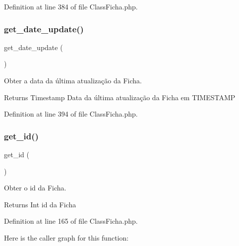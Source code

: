 Definition at line 384 of file Class\+Ficha.\+php.

\mbox{\label{class_class_ficha_ab88c852c9268bc8bf4f41240068dc81e}} 
\subsubsection{\texorpdfstring{get\+\_\+date\+\_\+update()}{get\_date\_update()}}
{\footnotesize\ttfamily get\+\_\+date\+\_\+update (\begin{DoxyParamCaption}{ }\end{DoxyParamCaption})}



Obter a data da última atualização da Ficha. 

\begin{DoxyReturn}{Returns}
Timestamp Data da última atualização da Ficha em T\+I\+M\+E\+S\+T\+A\+MP 
\end{DoxyReturn}


Definition at line 394 of file Class\+Ficha.\+php.

\mbox{\label{class_class_ficha_a8a94003b9d888b085c68d6eac44be175}} 
\subsubsection{\texorpdfstring{get\+\_\+id()}{get\_id()}}
{\footnotesize\ttfamily get\+\_\+id (\begin{DoxyParamCaption}{ }\end{DoxyParamCaption})}



Obter o id da Ficha. 

\begin{DoxyReturn}{Returns}
Int id da Ficha 
\end{DoxyReturn}


Definition at line 165 of file Class\+Ficha.\+php.

Here is the caller graph for this function\+:
\mbox{\label{class_class_ficha_a4f1149ccbd69d1ac4225b7bc2dd871bb}} 
